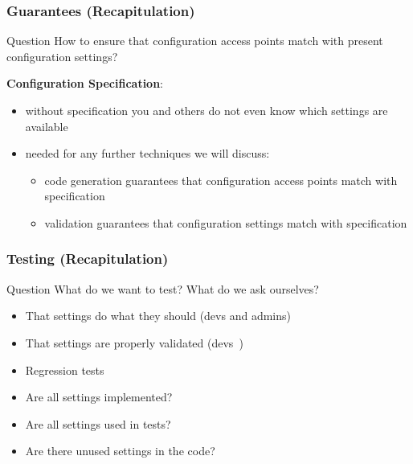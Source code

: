 \begin{frame}
	\frametitle{Guarantees (Recapitulation)}
	\begin{alertblock}{Question}
	How to ensure that configuration access points match with present configuration settings?
	\end{alertblock}

	\pause
	\vspace{1em}

	\textbf{Configuration Specification}:
	\begin{itemize}
	\item without specification you and others do not even know which settings are available
	\item needed for any further techniques we will discuss:
		\begin{itemize}
		\item code generation guarantees that configuration access points match with specification
		\item validation guarantees that configuration settings match with specification
		\end{itemize}
	\end{itemize}
\end{frame}


\begin{frame}
	\frametitle{Testing (Recapitulation)}
	\begin{alertblock}{Question}
	What do we want to test?
	What do we ask ourselves?
	\end{alertblock}

	\pause

	\begin{itemize}
	\item That settings do what they should (devs and admins)
	\item That settings are properly validated (devs~\cite{xu2013blame})
	\item Regression tests~\cite{qu2008configuration}
	\vspace{1em}
	\item Are all settings implemented?
	\item Are all settings used in tests?
	\item Are there unused settings in the code?
	\end{itemize}
\end{frame}

